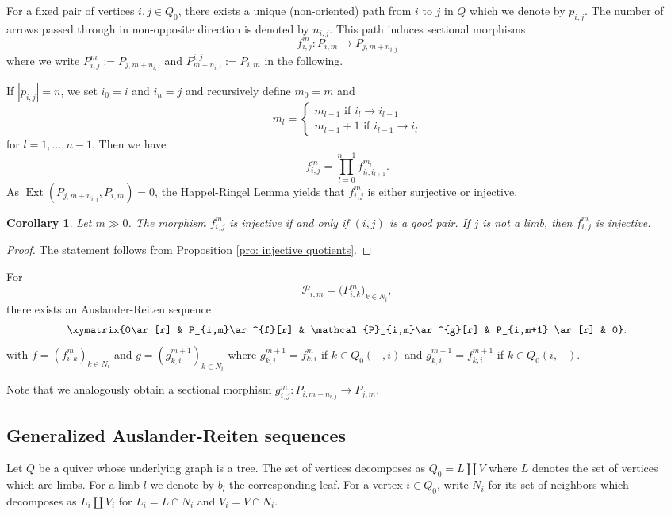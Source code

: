 \documentclass{amsart}
\newcommand{\sayT}[1]{\say[T]{#1}}
\newtheorem{corollary}[theorem]{Corollary}
\numberwithin{equation}{section}
\newcommand{\cP}{\mathcal{P}}
\newcommand{\Ext}{\operatorname{Ext}}
\newcommand{\Ses}[5]{\xymatrix{0\ar[r] & #1\ar^{#4}[r] & #2\ar^{#5}[r] & #3 \ar[r] & 0}}
\begin{document}
For a fixed pair of vertices $i,j\in Q_0$, there exists a unique (non-oriented) path from $i$ to $j$ in $Q$ which we denote by $p_{i,j}$. The number of arrows passed through in non-opposite direction is denoted by $n_{i,j}$. This path induces sectional morphisms
$$f_{i,j}^m:P_{i,m}\to P_{j,m+n_{i,j}}$$
where we write $P_{i,j}^m:=P_{j,m+n_{i,j}}$ and $P_{m+n_{i,j}}^{i,j}:=P_{i,m}$ in the following.


If $|p_{i,j}|=n$, we set $i_0=i$ and $i_n=j$ and recursively define $m_0=m$ and 
$$m_l=\begin{cases}m_{l-1}\text{ if $i_{l}\to i_{l-1}$}\\m_{l-1}+1\text{ if $i_{l-1}\to i_l$}\end{cases}$$
for $l=1,\ldots,n-1$. Then we have $$f_{i,j}^m=\prod_{l=0}^{n-1} f_{i_l,i_{l+1}}^{m_l}.$$
As $\Ext(P_{j,m+n_{i,j}},P_{i,m})=0$, the Happel-Ringel Lemma yields that  $f_{i,j}^m$ is either surjective or injective\sayT{more details on vanishing $\Ext$}. 



\begin{corollary}\label{cor:sectional morphisms}Let $m\gg 0$. The morphism $f_{i,j}^m$ is injective if and only if $(i,j)$ is a good pair. If $j$ is not a limb, then $f_{i,j}^m$ is injective.


\end{corollary}
\begin{proof} The statement follows from Proposition \ref{pro: injective quotients}. 



\end{proof}

For 
$$\cP_{i,m}=\big(P_{i,k}^m\big)_{k\in N_i},$$
there exists an Auslander-Reiten sequence
$$\Ses{P_{i,m}}{\cP_{i,m}}{P_{i,m+1}}{f}{g}.$$
with $f=(f_{i,k}^m)_{k\in N_i}$ and $g=(g_{k,i}^{m+1})_{k\in N_i}$ where $g^{m+1}_{k,i}=f_{k,i}^m$ if $k\in Q_0(-,i)$ and $g^{m+1}_{k,i}=f_{k,i}^{m+1}$ if $k\in Q_0(i,-)$.

Note that we analogously obtain a sectional morphism $g_{i,j}^m:P_{i,m-n_{i,j}}\to P_{j,m}$.




\subsection{Generalized Auslander-Reiten sequences}
Let $Q$ be a quiver whose underlying graph is a tree. The set of vertices decomposes as 
$Q_0=L\coprod V$ where $L$ denotes the set of vertices which are limbs. For a limb $l$ we denote by $b_l$ the corresponding leaf. For a vertex $i\in Q_0$, write 
$N_i$ for its set of neighbors which decomposes as $L_i\coprod V_i$ for $L_i=L\cap N_i$ and $V_i=V\cap N_i$. 
\end{document}
